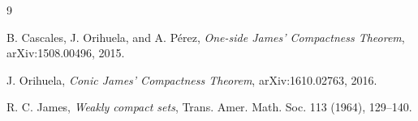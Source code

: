 \documentclass[11pt]{article}
\begin{document}
\begin{thebibliography}{9}

B. Cascales, J. Orihuela, and A. P\'erez,
\emph{One-side James' Compactness Theorem},
arXiv:1508.00496, 2015.

J. Orihuela,
\emph{Conic James' Compactness Theorem},
arXiv:1610.02763, 2016.

R. C. James,
\emph{Weakly compact sets},
Trans. Amer. Math. Soc. 113 (1964), 129--140.

\end{thebibliography}
\end{document}
